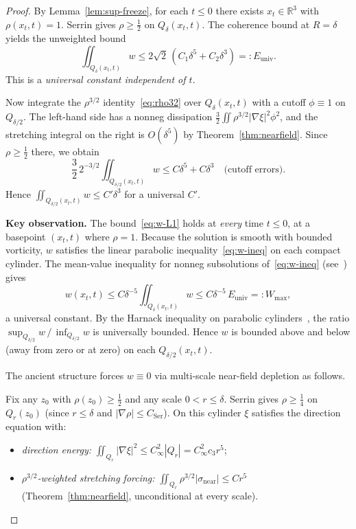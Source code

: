 \documentclass[12pt, reqno]{amsart}
\theoremstyle{definition}
\theoremstyle{remark}
\numberwithin{equation}{section}
\newcommand{\R}{\mathbb{R}}
\begin{document}
\begin{proof}
By Lemma~\ref{lem:sup-freeze}, for each $t\le 0$ there exists
$x_t\in\R^3$ with $\rho(x_t,t)=1$.  Serrin gives
$\rho\ge\tfrac12$ on $Q_\delta(x_t,t)$.  The coherence bound at
$R=\delta$ yields the unweighted bound
\begin{equation}\label{eq:w-L1}
\iint_{Q_\delta(x_t,t)} w
\le 2\sqrt{2}\,(C_1\delta^5+C_2\delta^3)
=:E_{\mathrm{univ}}.
\end{equation}
This is a \emph{universal constant independent of $t$}.

Now integrate the $\rho^{3/2}$ identity~\eqref{eq:rho32} over
$Q_\delta(x_t,t)$ with a cutoff $\phi\equiv 1$ on $Q_{\delta/2}$.
The left-hand side has a nonneg dissipation
$\frac{3}{2}\iint\rho^{3/2}|\nabla\xi|^2\phi^2$, and the
stretching integral on the right is $O(\delta^5)$ by
Theorem~\ref{thm:nearfield}.  Since $\rho\ge\tfrac12$ there,
we obtain
\[
\frac{3}{2}\,2^{-3/2}\iint_{Q_{\delta/2}(x_t,t)} w
\le C\delta^5 + C\delta^3
\quad\text{(cutoff errors)}.
\]
Hence $\iint_{Q_{\delta/2}(x_t,t)} w\le C'\delta^3$ for a
universal $C'$.

\textbf{Key observation.}  The bound~\eqref{eq:w-L1} holds at
\emph{every} time $t\le 0$, at a basepoint $(x_t,t)$ where
$\rho=1$.  Because the solution is smooth with bounded vorticity,
$w$ satisfies the linear parabolic inequality~\eqref{eq:w-ineq}
on each compact cylinder.  The mean-value inequality for nonneg
subsolutions of~\eqref{eq:w-ineq}
(see~\cite[Theorem~7.21]{Lieberman}) gives
\[
w(x_t,t)\le C\delta^{-5}\iint_{Q_\delta(x_t,t)} w
\le C\delta^{-5}\,E_{\mathrm{univ}}
=:W_{\max},
\]
a universal constant.  By the Harnack inequality on parabolic
cylinders~\cite{Lieberman}, the ratio
$\sup_{Q_{\delta/2}}w\,/\,\inf_{Q_{\delta/2}}w$ is universally
bounded.  Hence $w$ is bounded above and below (away from zero
or at zero) on each $Q_{\delta/2}(x_t,t)$.

The ancient structure forces $w\equiv 0$ via multi-scale
near-field depletion as follows.

Fix any $z_0$ with $\rho(z_0)\ge\tfrac12$ and any scale
$0<r\le\delta$.  Serrin gives $\rho\ge\tfrac14$ on $Q_r(z_0)$
(since $r\le\delta$ and $|\nabla\rho|\le C_{\mathrm{Ser}}$).
On this cylinder $\xi$ satisfies the direction equation with:
\begin{itemize}[leftmargin=2em,nosep]
\item \emph{direction energy:}
$\iint_{Q_r}|\nabla\xi|^2\le C_\infty^2|Q_r|=C_\infty^2 c_3 r^5$;
\item \emph{$\rho^{3/2}$-weighted stretching forcing:}
$\iint_{Q_r}\rho^{3/2}|\sigma_{\mathrm{near}}|\le Cr^5$
(Theorem~\ref{thm:nearfield}, unconditional at every scale).
\end{itemize}


\end{proof}
\end{document}
